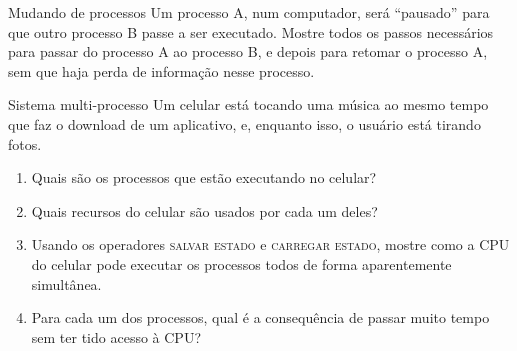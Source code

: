 \documentclass{beamer}
\begin{document}
\begin{frame}{Mudando de processos}
  \large
  Um processo A, num computador, será ``pausado'' para que outro
  processo B passe a ser executado. Mostre todos os passos necessários para
  passar do processo A ao processo B, e depois para retomar o processo A, sem
  que haja perda de informação nesse processo.
\end{frame}

\begin{frame}{Sistema multi-processo}
  \Large
  Um celular está tocando uma música ao mesmo tempo que faz o download de um
  aplicativo, e, enquanto isso, o usuário está tirando fotos.
  \begin{enumerate}
    \item Quais são os processos que estão executando no celular?
    \item Quais recursos do celular são usados por cada um deles?
    \item Usando os operadores \textsc{salvar estado} e \textsc{carregar
      estado}, mostre como a CPU do celular pode executar os processos todos de
      forma aparentemente simultânea.
    \item Para cada um dos processos, qual é a consequência de passar muito tempo
      sem ter tido acesso à CPU?
  \end{enumerate}

\end{frame}
\end{document}
